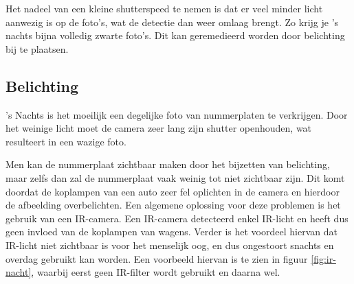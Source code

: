 Het nadeel van een kleine shutterspeed te nemen is dat er veel minder licht aanwezig is op de foto's, wat de detectie dan weer omlaag brengt. Zo krijg je 's nachts bijna volledig zwarte foto's. Dit kan geremedieerd worden door belichting bij te plaatsen.

\subsection{Belichting}
's Nachts is het moeilijk een degelijke foto van nummerplaten te verkrijgen. Door het weinige licht moet de camera zeer lang zijn shutter openhouden, wat resulteert in een wazige foto.

Men kan de nummerplaat zichtbaar maken door het bijzetten van belichting, maar zelfs dan zal de nummerplaat vaak weinig tot niet zichtbaar zijn. Dit komt doordat de koplampen van een auto zeer fel oplichten in de camera en hierdoor de afbeelding overbelichten. Een algemene oplossing voor deze problemen is het gebruik van een IR-camera. Een IR-camera detecteerd enkel IR-licht en heeft dus geen invloed van de koplampen van wagens. Verder is het voordeel hiervan dat IR-licht niet zichtbaar is voor het menselijk oog, en dus ongestoort snachts en overdag gebruikt kan worden. Een voorbeeld hiervan is te zien in figuur \ref{fig:ir-nacht}, waarbij eerst geen IR-filter wordt gebruikt en daarna wel.

